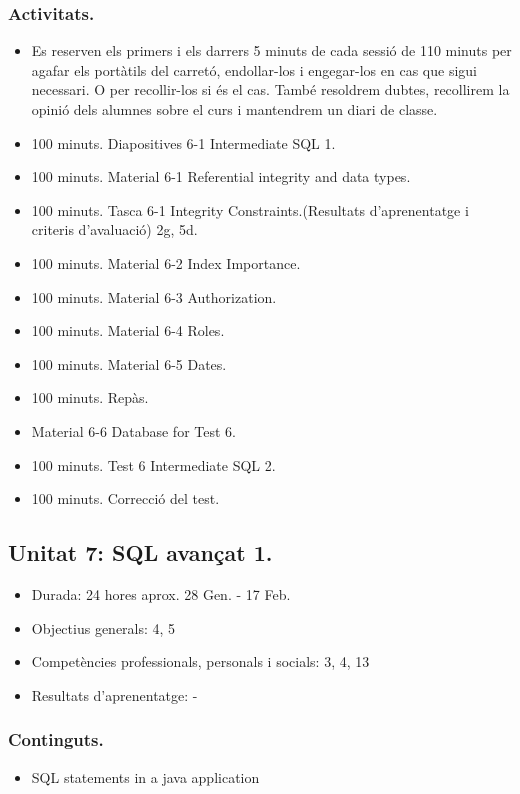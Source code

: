 \documentclass[catalan, a4paper, 12pt, titlepage]{article}
\begin{document}
  \subsubsection{Activitats.}
  \begin{itemize}
          \item Es reserven els primers i els darrers 5 minuts de cada sessió de 110 minuts per agafar els portàtils del carretó, endollar-los i engegar-los en cas que sigui necessari. O per recollir-los si és el cas. També resoldrem dubtes, recollirem la opinió dels alumnes sobre el curs i mantendrem un diari de classe.
	  \item 100 minuts. Diapositives 6-1 Intermediate SQL 1.
	  \item 100 minuts. Material 6-1 Referential integrity and data types.
	  \item 100 minuts. Tasca 6-1 Integrity Constraints.(\faGraduationCap Resultats d'aprenentatge i criteris d'avaluació) 2g, 5d. 
	  \item 100 minuts. Material 6-2 Index Importance.
	  \item 100 minuts. Material 6-3 Authorization.
	  \item 100 minuts. Material 6-4 Roles.
	  \item 100 minuts. Material 6-5 Dates.
	  \item 100 minuts. Repàs.
	  \item Material 6-6 Database for Test 6.
	  \item 100 minuts. Test 6 Intermediate SQL 2.
	  \item 100 minuts. Correcció del test.
  \end{itemize}
  

  \subsection{Unitat 7: SQL avançat 1.}

  \begin{itemize}
	\item Durada: 24 hores aprox. 28 Gen. - 17 Feb.
	\item Objectius generals: 4, 5
	\item Competències professionals, personals i socials: 3, 4, 13
	\item Resultats d'aprenentatge: -
  \end{itemize}
  
  \subsubsection{Continguts.}
  \begin{itemize}
	  \item SQL statements in a java application
  \end{itemize}
\end{document}
